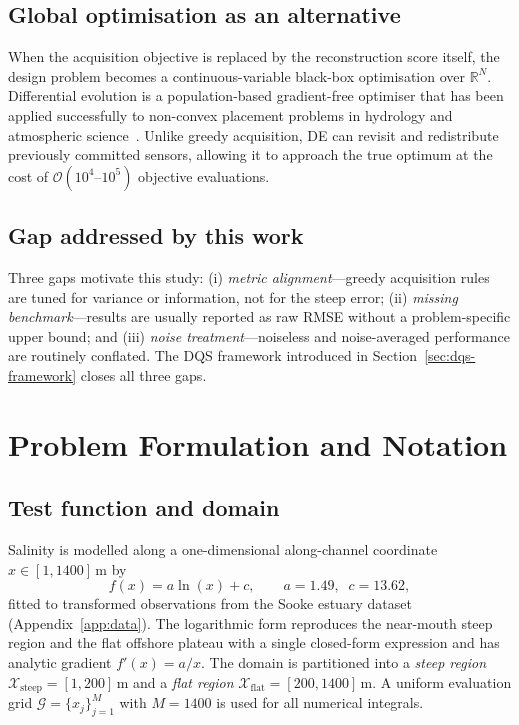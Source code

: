 \documentclass[11pt,letterpaper]{article}
\begin{document}
\subsection{Global optimisation as an alternative}
When the acquisition objective is replaced by the reconstruction score
itself, the design problem becomes a continuous-variable black-box
optimisation over $\mathbb{R}^{N}$. Differential evolution
\citep{storn1997differential} is a population-based gradient-free
optimiser that has been applied successfully to non-convex placement
problems in hydrology and atmospheric
science~\citep{reed2013evolutionary}. Unlike greedy acquisition, DE can
revisit and redistribute previously committed sensors, allowing it to
approach the true optimum at the cost of
$\mathcal{O}(10^{4}\text{--}10^{5})$ objective evaluations.

\subsection{Gap addressed by this work}
Three gaps motivate this study: (i) \emph{metric alignment}---greedy
acquisition rules are tuned for variance or information, not for the
steep error; (ii) \emph{missing benchmark}---results are usually
reported as raw RMSE without a problem-specific upper bound; and
(iii) \emph{noise treatment}---noiseless and noise-averaged performance
are routinely conflated. The DQS framework introduced in
Section~\ref{sec:dqs-framework} closes all three gaps.

\section{Problem Formulation and Notation}
\label{sec:problem}

\subsection{Test function and domain}
\label{sec:test-function}
Salinity is modelled along a one-dimensional along-channel coordinate
$x\in[1,1400]\,\mathrm{m}$ by
\begin{equation}
\label{eq:testfun}
f(x)=a\ln(x)+c,\qquad a=1.49,\;\; c=13.62,
\end{equation}
fitted to transformed observations from the Sooke estuary dataset
(Appendix~\ref{app:data}). The logarithmic form reproduces the
near-mouth steep region and the flat offshore plateau with a single
closed-form expression and has analytic gradient $f'(x)=a/x$. The
domain is partitioned into a \emph{steep region}
$\mathcal{X}_{\text{steep}}=[1,200]\,\mathrm{m}$ and a \emph{flat region}
$\mathcal{X}_{\text{flat}}=[200,1400]\,\mathrm{m}$. A uniform evaluation
grid $\mathcal{G}=\{x_{j}\}_{j=1}^{M}$ with $M=1400$ is used for all
numerical integrals.
\end{document}
